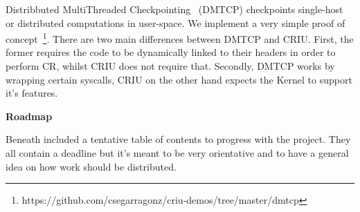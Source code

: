 \documentclass[a4paper, 10pt]{article}
\begin{document}
Distribbuted MultiThreaded Checkpointing~\cite{dmtcp} (DMTCP) checkpoints single-host or distributed computations in user-space.
We implement a very simple proof of concept~\footnote{https://github.com/csegarragonz/criu-demos/tree/master/dmtcp}.
There are two main differences between DMTCP and CRIU.
First, the former requires the code to be dynamically linked to their headers in order to perform CR, whilst CRIU does not require that.
Secondly, DMTCP works by wrapping certain syscalls, CRIU on the other hand expects the Kernel to support it's features.

\textbf{Roadmap}

Beneath included a tentative table of contents to progress with the project.
They all contain a deadline but it's meant to be very orientative and to have a general idea on how work should be distributed.
\end{document}
